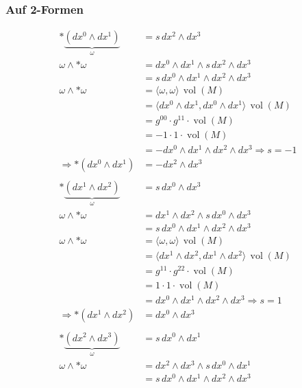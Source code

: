 \subsubsection{Auf 2-Formen}
\begin{align*}
	\ast \underbrace{(dx^0 \wedge dx^1)}_{\omega}
	&=
	s \, dx^2 \wedge dx^3
	\\
	\omega \wedge \ast \omega
	&=
	dx^0 \wedge dx^1 \wedge s \, dx^2 \wedge dx^3
	\\
	&=
	s \, dx^0 \wedge dx^1 \wedge dx^2 \wedge dx^3
	\\
	\omega \wedge \ast \omega
	&=
	\langle \omega, \omega \rangle \, \operatorname{vol}(M)
	\\
	&=
	\langle dx^0 \wedge dx^1, dx^0 \wedge dx^1 \rangle \, \operatorname{vol}(M)
	\\
	&=
	g^{00} \cdot g^{11} \cdot \operatorname{vol}(M)
	\\
	&=
	-1 \cdot 1 \cdot \operatorname{vol}(M)
	\\
	&=
	-dx^0 \wedge dx^1 \wedge dx^2 \wedge dx^3 \Rightarrow s = -1
	\\
	\Rightarrow \ast(dx^0 \wedge dx^1)
	&=
	-dx^2 \wedge dx^3
\\
\\
	\ast \underbrace{(dx^1 \wedge dx^2)}_{\omega}
	&=
	s \, dx^0 \wedge dx^3
	\\
	\omega \wedge \ast \omega
	&=
	dx^1 \wedge dx^2 \wedge s \, dx^0 \wedge dx^3
	\\
	&=
	s \, dx^0 \wedge dx^1 \wedge dx^2 \wedge dx^3
	\\
	\omega \wedge \ast \omega
	&=
	\langle \omega, \omega \rangle \, \operatorname{vol}(M)
	\\
	&=
	\langle dx^1 \wedge dx^2, dx^1 \wedge dx^2 \rangle \, \operatorname{vol}(M)
	\\
	&=
	g^{11} \cdot g^{22} \cdot \operatorname{vol}(M)
	\\
	&=
	1 \cdot 1 \cdot \operatorname{vol}(M)
	\\
	&=
	dx^0 \wedge dx^1 \wedge dx^2 \wedge dx^3 \Rightarrow s = 1
	\\
	\Rightarrow \ast(dx^1 \wedge dx^2)
	&=
	dx^0 \wedge dx^3
\\
\\
	\ast \underbrace{(dx^2 \wedge dx^3)}_{\omega}
	&=
	s \, dx^0 \wedge dx^1
	\\
	\omega \wedge \ast \omega
	&=
	dx^2 \wedge dx^3 \wedge s \, dx^0 \wedge dx^1
	\\
	&=
	s \, dx^0 \wedge dx^1 \wedge dx^2 \wedge dx^3
	\\

\end{align*}
